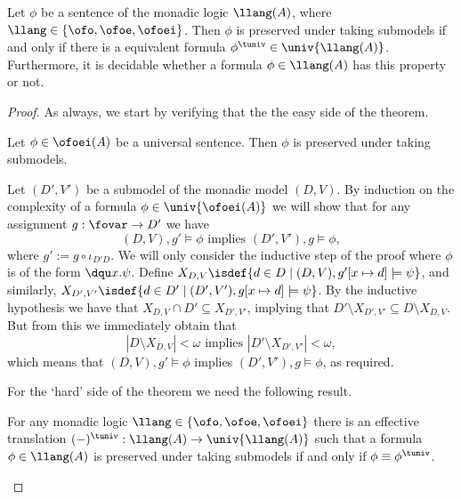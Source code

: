 \begin{theorem}
\label{t:univ}
Let $\phi$ be a sentence of the monadic logic $\llang(A)$, where $\llang \in 
\{ \ofo, \ofoe, \ofoei \}$.
Then $\phi$ is preserved under taking submodels if and only if there is a 
equivalent formula $\phi^{\tuniv} \in \univ{\llang(A)}$.
Furthermore, it is decidable whether a formula $\phi \in \llang(A)$ has this 
property or not.
\end{theorem}
\begin{proof}
As always, we start by verifying that the the easy side of the theorem.

\begin{claimfirst}
\label{c:univ1}
Let $\phi \in \ofoei(A)$ be a universal sentence. 
Then $\phi$ is preserved under taking submodels.
\end{claimfirst}

\begin{pfclaim} %
Let $(D',V')$ be a submodel of the monadic model $(D,V)$.
By induction on the complexity of a formula $\phi \in \univ{\ofoei(A)}$ we will 
show that for any assignment $g: \fovar \to D'$ we have
\[
(D,V),g' \models \phi \text{ implies } (D',V'),g \models \phi,
\]
where $g':= g \circ \iota_{D'D}$.
We will only consider the inductive step of the proof where $\phi$ is of the 
form $\dqu x. \psi$.
Define $X_{D,V} \isdef \{ d \in D \mid (D,V), g'[x \mapsto d] \models \psi \}$,
and similarly, $X_{D',V'} \isdef \{ d \in D' \mid (D',V'), g[x \mapsto d] \models 
\psi \}$.
By the inductive hypothesis we have that $X_{D,V} \cap D' \subseteq X_{D',V'}$,
implying that $D' \setminus X_{D',V'} \subseteq D \setminus X_{D,V}$.
But from this we immediately obtain that 
\[
|D \setminus X_{D,V}| < \omega
\text{ implies } |D' \setminus X_{D',V'}| < \omega,
\]
which means that $(D,V),g' \models \phi$ implies $ (D',V'),g \models \phi$, as 
required.
\end{pfclaim}

For the `hard' side of the theorem we need the following result.

\begin{claim} 
\label{c:univ2}
For any monadic logic $\llang \in \{ \ofo, \ofoe, \ofoei \}$ there is an effective 
translation $(-)^\tuniv: \llang(A) \to \univ{\llang(A)}$ such that a
formula $\phi \in \llang(A)$ is preserved under taking submodels if and only if
$\phi\equiv \phi^\tuniv$.
\end{claim}


\end{proof}
